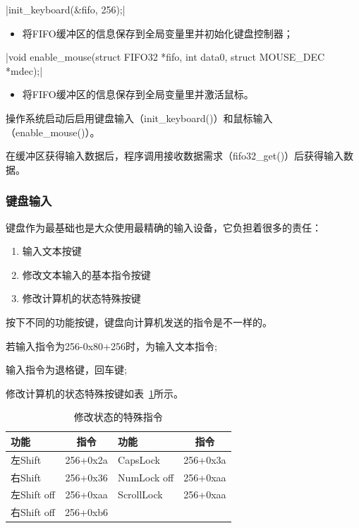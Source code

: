 \csingle|init_keyboard(&fifo, 256);|
\begin{itemize}
  \item 将FIFO缓冲区的信息保存到全局变量里并初始化键盘控制器；
\end{itemize}

\csingle|void enable_mouse(struct FIFO32 *fifo, int data0, struct MOUSE_DEC *mdec);|
\begin{itemize}
  \item 将FIFO缓冲区的信息保存到全局变量里并激活鼠标。\\
\end{itemize}

操作系统启动后启用键盘输入（init\_keyboard()）和鼠标输入（enable\_mouse()）。

在缓冲区获得输入数据后，程序调用接收数据需求（fifo32\_get()）后获得输入数据。

\subsubsection{键盘输入}

键盘作为最基础也是大众使用最精确的输入设备，它负担着很多的责任：
\begin{enumerate}
\item 输入文本按键
\item 修改文本输入的基本指令按键
\item 修改计算机的状态特殊按键
\end{enumerate}

按下不同的功能按键，键盘向计算机发送的指令是不一样的。

若输入指令为256-0x80+256时，为输入文本指令;

输入指令为退格键，回车键;

修改计算机的状态特殊按键如表~\ref{tab:spccmd}所示。
\begin{table}[!ht]
  \centering
  \begin{tabular}{lc|lc}
    \hline 功能 & 指令 & 功能 & 指令 \\
    \hline 左Shift & 256+0x2a & CapsLock & 256+0x3a \\ 
     右Shift & 256+0x36 & NumLock off & 256+0xaa \\
     左Shift off & 256+0xaa & ScrollLock & 256+0xaa \\
     右Shift off & 256+0xb6 & & \\
    \hline
  \end{tabular}
  \caption{修改状态的特殊指令}
  \label{tab:spccmd}
\end{table}


